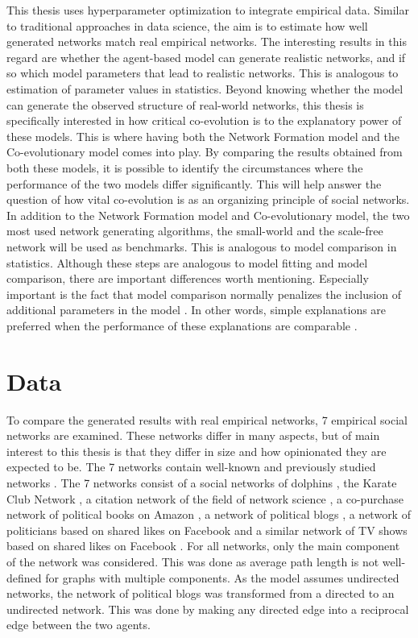 \documentclass[11pt]{article}
\begin{document}
\noindent This thesis uses hyperparameter optimization to integrate empirical data. Similar to traditional approaches in data science, the aim is to estimate how well generated networks match real empirical networks. The interesting results in this regard are whether the agent-based model can generate realistic networks, and if so which model parameters that lead to realistic networks. This is analogous to estimation of parameter values in statistics. Beyond knowing whether the model can generate the observed structure of real-world networks, this thesis is specifically interested in how critical co-evolution is to the explanatory power of these models. This is where having both the Network Formation model and the Co-evolutionary model comes into play. By comparing the results obtained from both these models, it is possible to identify the circumstances where the performance of the two models differ significantly. This will help answer the question of how vital co-evolution is as an organizing principle of social networks. In addition to the Network Formation model and Co-evolutionary model, the two most used network generating algorithms, the small-world \cite{watts_collective_1998} and the scale-free network \cite{barabasi_scale-free_2003} will be used as benchmarks. This is analogous to model comparison in statistics. 
Although these steps are analogous to model fitting and model comparison, there are important differences worth mentioning. Especially important is the fact that model comparison normally penalizes the inclusion of additional parameters in the model \cite{vrieze_model_2012}. In other words, simple explanations are preferred when the performance of these explanations are comparable \cite{ emiliano2014information, vrieze_model_2012}.

\section{Data}
To compare the generated results with real empirical networks, 7 empirical social networks are examined. These networks differ in many aspects, but of main interest to this thesis is that they differ in size and how opinionated they are expected to be. The 7 networks contain well-known and previously studied networks \cite{rossi_network_2015}. The 7 networks consist of a social networks of dolphins \cite{lusseau_bottlenose_2003}, the Karate Club Network \cite{zachary_information_1977}, a citation network of the field of network science \cite{newman_finding_2006}, a co-purchase network of political books on Amazon \cite{shi_millions_2017}, a network of political blogs \cite{adamic_political_2005}, a network of politicians based on shared likes on Facebook and a similar network of TV shows based on shared likes on Facebook \cite{rozemberczki2019gemsec}. For all networks, only the main component of the network was considered. This was done as average path length is not well-defined for graphs with multiple components. As the model assumes undirected networks, the network of political blogs was transformed from a directed to an undirected network. This was done by making any directed edge into a reciprocal edge between the two agents.
\end{document}
